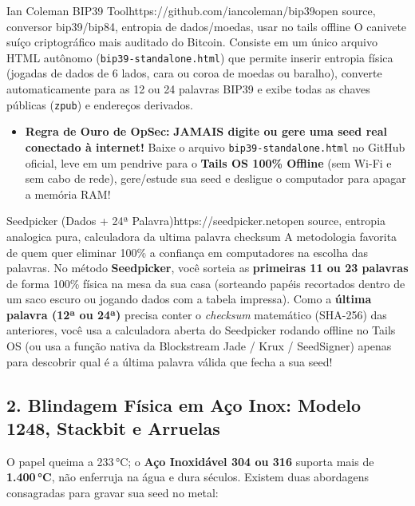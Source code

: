 \documentclass{pousadaguide}
\begin{document}
\begin{ferramenta}[goat,logo=bip39]{Ian Coleman BIP39 Tool}{https://github.com/iancoleman/bip39}{open source, conversor bip39/bip84, entropia de dados/moedas, usar no tails offline}
O canivete suíço criptográfico mais auditado do Bitcoin. Consiste em um único arquivo HTML autônomo (\texttt{bip39-standalone.html}) que permite inserir entropia física (jogadas de dados de 6 lados, cara ou coroa de moedas ou baralho), converte automaticamente para as 12 ou 24 palavras BIP39 e exibe todas as chaves públicas (\texttt{zpub}) e endereços derivados.
\begin{itemize}
  \item \textbf{Regra de Ouro de OpSec:} \textbf{JAMAIS digite ou gere uma seed real conectado à internet!} Baixe o arquivo \texttt{bip39-standalone.html} no GitHub oficial, leve em um pendrive para o \textbf{Tails OS 100\% Offline} (sem Wi-Fi e sem cabo de rede), gere/estude sua seed e desligue o computador para apagar a memória RAM!
\end{itemize}
\end{ferramenta}

\begin{ferramenta}[goat,logo=seedpicker]{Seedpicker (Dados + 24ª Palavra)}{https://seedpicker.net}{open source, entropia analogica pura, calculadora da ultima palavra checksum}
A metodologia favorita de quem quer eliminar 100\% a confiança em computadores na escolha das palavras. No método \textbf{Seedpicker}, você sorteia as \textbf{primeiras 11 ou 23 palavras} de forma 100\% física na mesa da sua casa (sorteando papéis recortados dentro de um saco escuro ou jogando dados com a tabela impressa). Como a \textbf{última palavra (12ª ou 24ª)} precisa conter o \emph{checksum} matemático (SHA-256) das anteriores, você usa a calculadora aberta do Seedpicker rodando offline no Tails OS (ou usa a função nativa da Blockstream Jade / Krux / SeedSigner) apenas para descobrir qual é a última palavra válida que fecha a sua seed! 
\end{ferramenta}

\subsection{2. Blindagem Física em Aço Inox: Modelo 1248, Stackbit e Arruelas}
O papel queima a 233\,°C; o \textbf{Aço Inoxidável 304 ou 316} suporta mais de \textbf{1.400\,°C}, não enferruja na água e dura séculos. Existem duas abordagens consagradas para gravar sua seed no metal:
\end{document}
